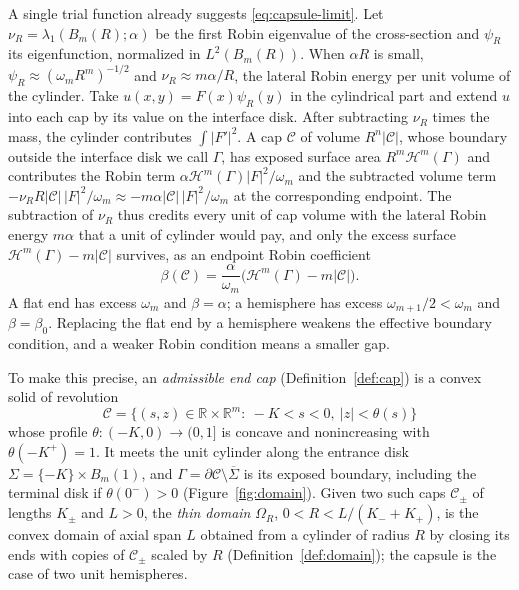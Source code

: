\documentclass[11pt,a4paper]{article}
\numberwithin{equation}{section}
\theoremstyle{paperplain}
\theoremstyle{remark}
\newcommand{\R}{\mathbb{R}}
\newcommand{\C}{\mathcal{C}}
\newcommand{\HH}{\mathcal{H}}
\begin{document}
A single trial function already suggests \eqref{eq:capsule-limit}. Let
$\nu_R=\lambda_1(B_m(R);\alpha)$ be the first Robin eigenvalue of the
cross-section and $\psi_R$ its eigenfunction, normalized in $L^2(B_m(R))$.
When $\alpha R$ is small, $\psi_R\approx(\omega_mR^m)^{-1/2}$ and
$\nu_R\approx m\alpha/R$, the lateral Robin energy per unit volume of the
cylinder. Take $u(x,y)=F(x)\psi_R(y)$ in the cylindrical part and extend
$u$ into each cap by its value on the interface disk. After subtracting
$\nu_R$ times the mass, the cylinder contributes $\int|F'|^2$. A cap $\C$ of volume $R^n|\C|$, whose boundary outside the interface disk
we call $\Gamma$, has exposed surface area $R^m\HH^m(\Gamma)$ and
contributes
the Robin term $\alpha\HH^m(\Gamma)|F|^2/\omega_m$ and the subtracted volume
term $-\nu_RR|\C|\,|F|^2/\omega_m\approx-m\alpha|\C|\,|F|^2/\omega_m$ at the
corresponding endpoint. The subtraction of $\nu_R$ thus credits every unit
of cap volume with the lateral Robin energy $m\alpha$ that a unit of
cylinder would pay, and only the excess surface $\HH^m(\Gamma)-m|\C|$
survives, as an endpoint Robin coefficient
\[
 \beta(\C)=\frac{\alpha}{\omega_m}\bigl(\HH^m(\Gamma)-m|\C|\bigr).
\]
A flat end has excess $\omega_m$ and $\beta=\alpha$; a hemisphere has
excess $\omega_{m+1}/2<\omega_m$ and $\beta=\beta_0$. Replacing the flat end
by a hemisphere weakens the effective boundary condition, and a weaker Robin
condition means a smaller gap.

To make this precise, an \emph{admissible end cap}
(Definition~\ref{def:cap}) is a convex solid of revolution
\[
 \C=\{(s,z)\in\R\times\R^m:\ -K<s<0,\ |z|<\theta(s)\}
\]
whose profile $\theta:(-K,0)\to(0,1]$ is concave and nonincreasing with
$\theta(-K^+)=1$. It meets the unit cylinder along the entrance disk
$\Sigma=\{-K\}\times B_m(1)$, and $\Gamma=\partial\C\setminus\overline\Sigma$
is its exposed boundary, including the terminal disk if $\theta(0^-)>0$
(Figure~\ref{fig:domain}). Given two such caps $\C_\pm$ of lengths $K_\pm$
and $L>0$, the \emph{thin domain} $\Omega_R$, $0<R<L/(K_-+K_+)$, is the
convex domain of axial span $L$ obtained from a cylinder of radius $R$ by
closing its ends with copies of $\C_\pm$ scaled by $R$
(Definition~\ref{def:domain}); the capsule is the case of two unit
hemispheres.
\end{document}
